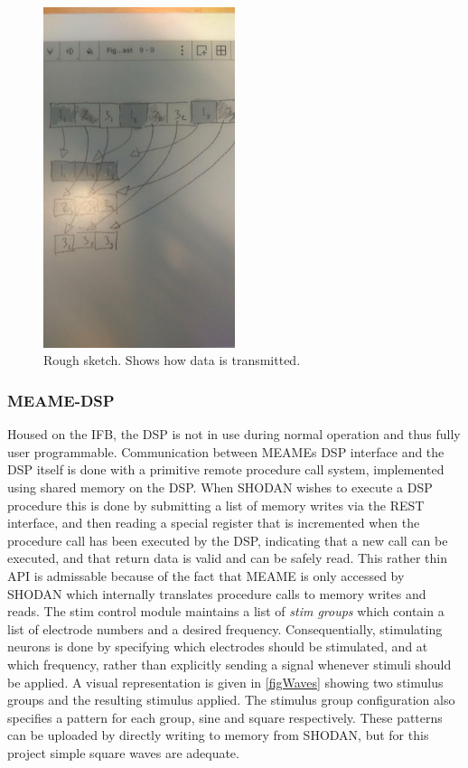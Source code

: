 \begin{figure}[h!]
  \centering
  \includegraphics[width=0.5\textwidth]{fig/rm/waveform_segmentation.jpg}
  \caption{Rough sketch.
    Shows how data is transmitted.
  }
  \label{figLayout}
\end{figure}
\subsubsection{MEAME-DSP}
Housed on the IFB, the DSP is not in use during normal operation and thus fully
user programmable.
Communication between MEAMEs DSP interface and the DSP itself is done with a
primitive remote procedure call system, implemented using shared memory on the
DSP.
When SHODAN wishes to execute a DSP procedure this is done by submitting a list
of memory writes via the REST interface, and then reading a special register
that is incremented when the procedure call has been executed by the DSP,
indicating that a new call can be executed, and that return data is valid and
can be safely read.
This rather thin API is admissable because of the fact that MEAME is only
accessed by SHODAN which internally translates procedure calls to memory writes
and reads.
The stim control module maintains a list of \emph{stim groups} which contain a
list of electrode numbers and a desired frequency.
Consequentially, stimulating neurons is done by specifying which electrodes
should be stimulated, and at which frequency, rather than explicitly sending a
signal whenever stimuli should be applied.
A visual representation is given in \ref{figWaves} showing two stimulus groups
and the resulting stimulus applied.
The stimulus group configuration also specifies a pattern for each group, sine
and square respectively.
These patterns can be uploaded by directly writing to memory from SHODAN, but
for this project simple square waves are adequate.
